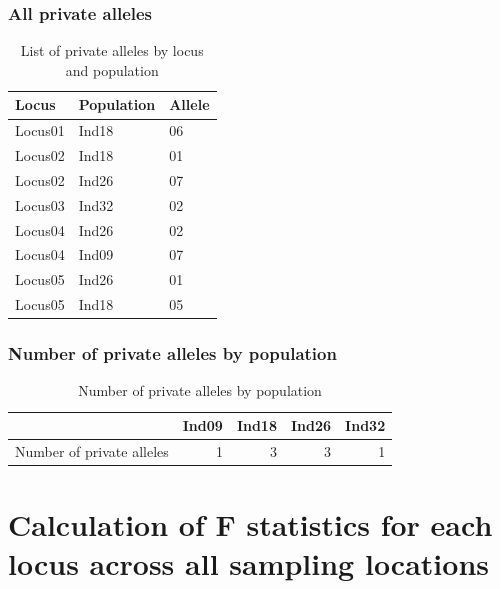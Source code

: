 \documentclass[a4paper]{scrartcl}\usepackage[]{graphicx}\usepackage[]{color}
\begin{document}
\subsubsection{All private alleles}
\begin{table}[ht]
\centering
\begin{tabular}{lll}
  \hline
Locus & Population & Allele \\ 
  \hline
Locus01 & Ind18 & 06 \\ 
  Locus02 & Ind18 & 01 \\ 
  Locus02 & Ind26 & 07 \\ 
  Locus03 & Ind32 & 02 \\ 
  Locus04 & Ind26 & 02 \\ 
  Locus04 & Ind09 & 07 \\ 
  Locus05 & Ind26 & 01 \\ 
  Locus05 & Ind18 & 05 \\ 
   \hline
\end{tabular}
\caption{List of private alleles by locus and population} 
\end{table}

\FloatBarrier
\subsubsection{Number of private alleles by population}
\begin{table}[ht]
\centering
\begin{tabular}{rrrrr}
  \hline
 & Ind09 & Ind18 & Ind26 & Ind32 \\ 
  \hline
Number of private alleles &   1 &   3 &   3 &   1 \\ 
   \hline
\end{tabular}
\caption{Number of private alleles by population} 
\end{table}


\FloatBarrier

\FloatBarrier

\FloatBarrier
\section{Calculation of F statistics for each locus across all sampling locations}
\end{document}
